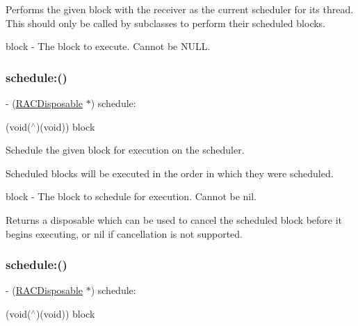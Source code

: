 Performs the given block with the receiver as the current scheduler for its thread. This should only be called by subclasses to perform their scheduled blocks.

block -\/ The block to execute. Cannot be N\+U\+LL. \mbox{\label{interface_r_a_c_scheduler_ab8e7e6634a86734797fa8db0919f9c16}} 
\subsubsection{\texorpdfstring{schedule\+:()}{schedule:()}\hspace{0.1cm}{\footnotesize\ttfamily [1/3]}}
{\footnotesize\ttfamily -\/ (\mbox{\hyperlink{interface_r_a_c_disposable}{R\+A\+C\+Disposable}} $\ast$) schedule\+: \begin{DoxyParamCaption}\item[{(void($^\wedge$)(void))}]{block }\end{DoxyParamCaption}}

Schedule the given block for execution on the scheduler.

Scheduled blocks will be executed in the order in which they were scheduled.

block -\/ The block to schedule for execution. Cannot be nil.

Returns a disposable which can be used to cancel the scheduled block before it begins executing, or nil if cancellation is not supported. \mbox{\label{interface_r_a_c_scheduler_ab8e7e6634a86734797fa8db0919f9c16}} 
\subsubsection{\texorpdfstring{schedule\+:()}{schedule:()}\hspace{0.1cm}{\footnotesize\ttfamily [2/3]}}
{\footnotesize\ttfamily -\/ (\mbox{\hyperlink{interface_r_a_c_disposable}{R\+A\+C\+Disposable}} $\ast$) schedule\+: \begin{DoxyParamCaption}\item[{(void($^\wedge$)(void))}]{block }\end{DoxyParamCaption}}

